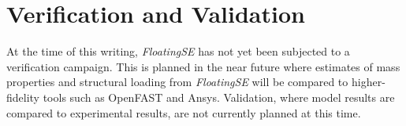 \section{Verification and Validation}
At the time of this writing, \textit{FloatingSE} has not yet been
subjected to a verification campaign.  This is planned in the near
future where estimates of mass properties and structural loading from
\textit{FloatingSE} will be compared to higher-fidelity tools such as
OpenFAST and Ansys.  Validation, where model results are compared to
experimental results, are not currently planned at this time.
